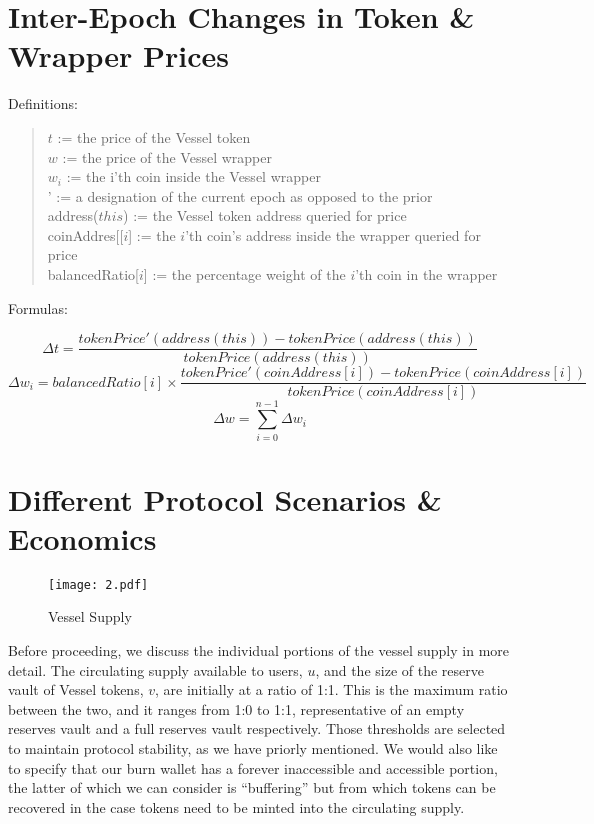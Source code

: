 \documentclass[letterpaper,11pt]{article}
\begin{document}
\section{Inter-Epoch Changes in Token \& Wrapper Prices}
\vspace{0.25cm}
\noindent Definitions:
\begin{quote}
$t$ := the price of the Vessel token\\
$w$ := the price of the Vessel wrapper\\
$w_i$ := the i’th coin inside the Vessel wrapper\\
' := a designation of the current epoch as opposed to the prior\\
address($this$) := the Vessel token address queried for price\\
coinAddres[[$i$] := the $i$’th coin’s address inside the wrapper queried for price\\
balancedRatio[$i$] := the percentage weight of the $i$’th coin in the wrapper\\
\end{quote}
Formulas:



$$\Delta t = \frac{tokenPrice'(address(this))-tokenPrice(address(this))}{tokenPrice(address(this))}$$
$$\Delta w_i = balancedRatio[i] \times \frac{tokenPrice'(coinAddress[i])-tokenPrice(coinAddress[i])}{tokenPrice(coinAddress[i])}$$
$$\Delta w = \sum_{i=0}^{n-1}\Delta w_i$$

\vspace{0.15cm}
\section{Different Protocol Scenarios \& Economics}

\begin{figure}[ht] 
        \centering \texttt{[image: 2.pdf]}
        \caption{\label{art_2}Vessel Supply
        }
\end{figure}

Before proceeding, we discuss the individual portions of the vessel supply in more detail. The circulating supply available to users, $u$, and the size of the reserve vault of Vessel tokens, $v$, are initially at a ratio of 1:1. This is the maximum ratio between the two, and it ranges from 1:0 to 1:1, representative of an empty reserves vault and a full reserves vault respectively. Those thresholds are selected to maintain protocol stability, as we have priorly mentioned. We would also like to specify that our burn wallet has a forever inaccessible and accessible portion, the latter of which we can consider is “buffering” but from which tokens can be recovered in the case tokens need to be minted into the circulating supply. \\
\end{document}
